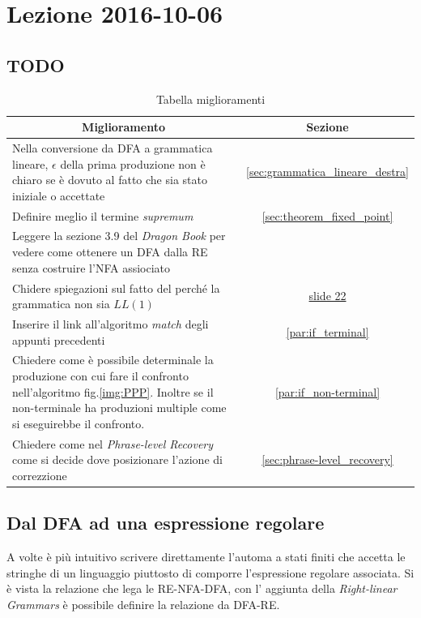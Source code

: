   \section{Lezione 2016-10-06}
\subsection{TODO}
\begin{table}[H]
\begin{center}
\begin{tabular}{|p{\textwidth}|c|}
\hline
\multicolumn{1}{|c|}{\textbf{Miglioramento}} & \textbf{Sezione} \\ \hline
Nella conversione da DFA a grammatica lineare, $\epsilon$ della prima produzione
non \`e chiaro se \`e dovuto al fatto che sia stato iniziale o accettate &
\ref{sec:grammatica_lineare_destra} \\ \hline
Definire meglio il termine \textit{supremum} &
\ref{sec:theorem_fixed_point} \\ \hline
Leggere la sezione 3.9 del \textit{Dragon Book} per vedere come ottenere un
DFA dalla RE senza costruire l'NFA assiociato & \\ \hline
Chidere spiegazioni sul fatto del perch\'e la grammatica non sia $LL(1)$ &
\href{http://www.di.unipi.it/~andrea/Didattica/PLP-16/SLIDES/PLP-2016-07.pdf}{
slide 22
} \\ \hline
Inserire il link all'algoritmo \textit{match} degli appunti precedenti &
\ref{par:if_terminal} \\ \hline
Chiedere come \`e possibile determinale la produzione con cui fare il confronto
nell'algoritmo fig.\ref{img:PPP}. Inoltre se il non-terminale ha produzioni
multiple come si eseguirebbe il confronto. &
\ref{par:if_non-terminal} \\ \hline
Chiedere come nel \textit{Phrase-level Recovery} come si decide dove posizionare
l'azione di correzzione & \ref{sec:phrase-level_recovery} \\ \hline
\end{tabular}
\end{center}
\caption{Tabella miglioramenti}
\label{tab:tab_todo}
\end{table}


\subsection{Dal DFA ad una espressione regolare}
A volte \`e pi\`u intuitivo scrivere direttamente l'automa a stati finiti che
accetta le stringhe di un linguaggio piuttosto di comporre l'espressione
regolare associata. Si \`e vista la relazione che lega le RE-NFA-DFA, con l'
aggiunta della \textit{Right-linear Grammars} \`e possibile definire la
relazione da DFA-RE.

